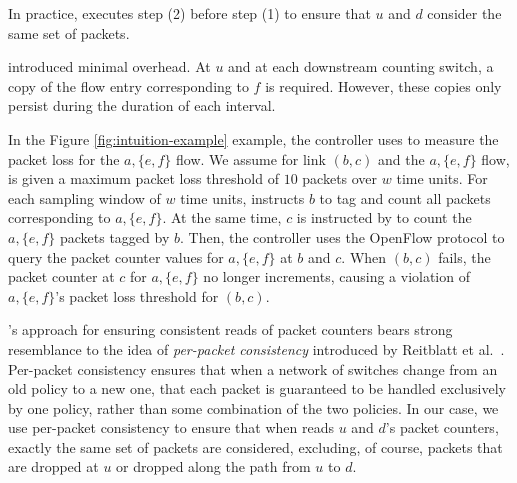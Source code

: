 In practice, \pcnt executes step (2) before step (1) to ensure that $u$ and $d$ consider the same set of packets.


\pcnt introduced minimal overhead.  At $u$ and at each downstream counting switch, a copy of the flow entry corresponding to $f$ is required.  
However, these copies only persist during the duration of each \pcnt interval.


In the Figure \ref{fig:intuition-example} example, the controller uses \fl to measure the packet loss for the $a,\{e,f\}$ flow.  
We assume for link $(b,c)$ and the $a,\{e,f\}$ flow, \fl is given a maximum packet loss threshold of $10$ packets over $w$ time units.
For each sampling window of $w$ time units, \pcnt instructs $b$ to tag and count all packets corresponding to $a,\{e,f\}$. 
At the same time, $c$ is instructed by \pcnt to count the $a,\{e,f\}$ packets tagged by $b$. Then, the controller uses the OpenFlow protocol to query the packet counter values for $a,\{e,f\}$
at $b$ and $c$.  When $(b,c)$ fails, the packet counter at $c$ for $a,\{e,f\}$ no longer increments, causing a violation of $a,\{e,f\}$'s packet loss threshold for $(b,c)$.



\pcnts's approach for ensuring consistent reads of packet counters bears strong resemblance to the idea of \emph{per-packet consistency} introduced by Reitblatt et al.~\cite{Reitblatt11}.
Per-packet consistency ensures that when a network of switches change from an old policy to a new one, that
each packet is guaranteed to be handled exclusively by one policy, rather than some combination of the two policies.  In our case, we use per-packet consistency to ensure that when \pcnt reads
$u$ and $d$'s packet counters, exactly the same set of packets are considered, excluding, of course, packets that are dropped at $u$ or dropped along the path from $u$ to $d$. 



